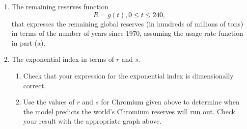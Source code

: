 \documentclass{ximera}
\newcommand{\pskip}{\vskip 0.1 in}
\begin{document}
\begin{question}
\begin{enumerate}
\item The remaining reserves function
\[
    R = g(t) , 0\leq t \leq 240,
\]
that expresses the remaining global reserves (in hundreds of millions of tons) in terms of the number of years since 1970, assuming the usage rate function in part (a).

\item The exponential index in terms of $r$ and $s$.

\begin{enumerate}
\item Check that your expression for the exponential index is dimensionally correct.

\item Use the values of $r$ and $s$ for Chromium given above to determine when the model predicts the world's Chromium reserves will run out. Check your result with the appropriate graph above. 

\end{enumerate}










\end{enumerate}


\end{question}
\end{document}
